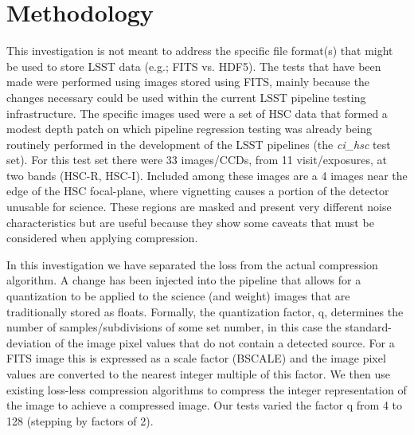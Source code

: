 \section{Methodology}

This investigation is not meant to address the specific file format(s) that might be
used to store LSST data (e.g.; FITS vs. HDF5).  The tests that have been made were performed
using images stored using FITS, mainly because the changes necessary could be used within 
the current LSST pipeline testing infrastructure.  The specific images used were a set of
HSC data that formed a modest depth patch on which pipeline regression testing was already 
being routinely performed in the development of the LSST pipelines (the {\it ci\_hsc} test set).  
For this test set there were 33 images/CCDs, from 11 visit/exposures, at two bands (HSC-R, HSC-I).
Included among these images are a 4 images near the edge of the HSC focal-plane, where 
vignetting causes a portion of the detector unusable for science.  These regions are 
masked and present very different noise characteristics but are useful because they show some 
caveats that must be considered when applying compression.

In this investigation we have separated the loss from the actual compression algorithm.
A change has been injected into the pipeline that allows for a quantization to be applied
to the science (and weight) images that are traditionally stored as floats.  Formally,
the quantization factor, q, determines the number of samples/subdivisions of some set
number, in this case the standard-deviation of the image pixel values that do not contain a 
detected source.  For a FITS image this is expressed as a scale factor (BSCALE) and the image 
pixel values are converted to the nearest integer multiple of this factor.  We then use existing
loss-less compression algorithms to compress the integer representation of the image
to achieve a compressed image.  Our tests varied the factor q from 4 to 128 (stepping by 
factors of 2).  

